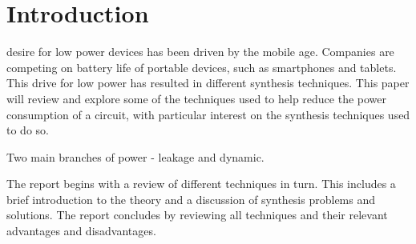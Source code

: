 

\section{Introduction}
 desire for low power devices has been driven by the mobile age.
Companies are competing on battery life of portable devices, such as smartphones and tablets.
This drive for low power has resulted in different synthesis techniques.
This paper will review and explore some of the techniques used to help reduce the power consumption of a circuit, with particular interest on the synthesis techniques used to do so.

Two main branches of power - leakage and dynamic. 

The report begins with a review of different techniques in turn. 
This includes a brief introduction to the theory and a discussion of synthesis problems and solutions.
The report concludes by reviewing all techniques and their relevant advantages and disadvantages. 


